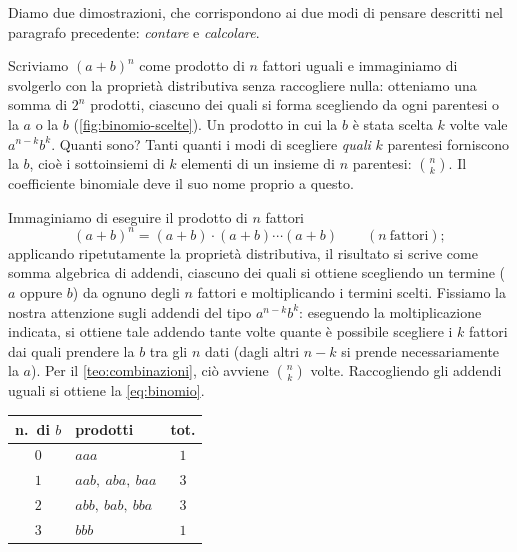 \begin{schema}
\end{schema}

Diamo due dimostrazioni, che corrispondono ai due modi di pensare descritti nel
paragrafo precedente: \emph{contare} e \emph{calcolare}.

\begin{strategia}
Scriviamo $(a+b)^{n}$ come prodotto di $n$ fattori uguali e immaginiamo di svolgerlo
con la proprietà distributiva senza raccogliere nulla: otteniamo una somma di $2^{n}$
prodotti, ciascuno dei quali si forma scegliendo da ogni parentesi o la $a$ o la $b$
(\cref{fig:binomio-scelte}). Un prodotto in cui la $b$ è stata scelta $k$ volte vale
$a^{n-k}b^{k}$. Quanti sono? Tanti quanti i modi di scegliere \emph{quali} $k$ parentesi
forniscono la $b$, cioè i sottoinsiemi di $k$ elementi di un insieme di $n$ parentesi:
$\binom nk$. Il coefficiente binomiale deve il suo nome proprio a questo.
\end{strategia}

\begin{dimostrazione}
Immaginiamo di eseguire il prodotto di $n$ fattori
\begin{equation}\label{eq:binomio-prodotto}
  (a+b)^{n}=(a+b)\cdot(a+b)\cdots(a+b) \qquad (n\ \text{fattori});
\end{equation}
applicando ripetutamente la proprietà distributiva, il risultato si scrive come somma
algebrica di addendi, ciascuno dei quali si ottiene scegliendo un termine ($a$ oppure
$b$) da ognuno degli $n$ fattori e moltiplicando i termini scelti. Fissiamo la nostra
attenzione sugli addendi del tipo $a^{n-k}b^{k}$: eseguendo la moltiplicazione indicata,
si ottiene tale addendo tante volte quante è possibile scegliere i $k$ fattori dai quali
prendere la $b$ tra gli $n$ dati (dagli altri $n-k$ si prende necessariamente la $a$).
Per il \cref{teo:combinazioni}, ciò avviene $\binom nk$ volte. Raccogliendo gli addendi
uguali si ottiene la \eqref{eq:binomio}.
\end{dimostrazione}

\begin{marginfigure}
\centering
\small
\renewcommand{\arraystretch}{1.15}
\begin{tabular}{@{}c@{\quad}l@{\quad}c@{}}
\toprule
n.\ di $b$ & prodotti & tot.\\
\midrule
$0$ & $aaa$ & $1$\\
$1$ & $aab,\ aba,\ baa$ & $3$\\
$2$ & $abb,\ bab,\ bba$ & $3$\\
$3$ & $bbb$ & $1$\\
\bottomrule
\end{tabular}
\caption{Gli $2^{3}=8$ prodotti che si ottengono svolgendo $(a+b)(a+b)(a+b)$, raggruppati
secondo il numero di $b$ scelte: $(a+b)^{3}=a^{3}+3a^{2}b+3ab^{2}+b^{3}$.}
\label{fig:binomio-scelte}
\end{marginfigure}

